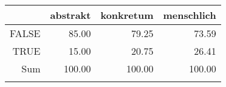 \begin{tabular}{rrrr}
  \lsptoprule
 & abstrakt & konkretum & menschlich \\ 
  \midrule
FALSE & 85.00 & 79.25 & 73.59 \\ 
  TRUE & 15.00 & 20.75 & 26.41 \\ 
  Sum & 100.00 & 100.00 & 100.00 \\ 
   \lspbottomrule
\end{tabular}
